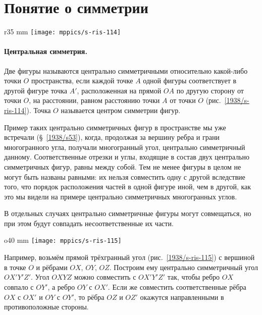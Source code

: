 \section{Понятие о симметрии}

\begin{wrapfigure}{r}{35 mm}
\vskip-0mm
\centering
\texttt{[image: mppics/s-ris-114]}
\caption{}\label{1938/s-ris-114}
\vskip-0mm
\end{wrapfigure}

\paragraph{Центральная симметрия.}\label{1938/s99}
Две фигуры называются центрально симметричными относительно какой-либо точки $O$ пространства, если каждой точке $A$ одной фигуры соответствует в другой фигуре точка $A'$, расположенная на прямой $OA$ по другую сторону от точки $O$, на расстоянии, равном расстоянию точки $A$ от точки $O$ (рис.~\ref{1938/s-ris-114}).
Точка $O$ называется центром симметрии фигур.

Пример таких центрально симметричных фигур в пространстве мы уже встречали (§~\ref{1938/s53}), когда, продолжая за вершину ребра и грани многогранного угла, получали многогранный угол, центрально симметричный данному.
Соответственные отрезки и углы, входящие в состав двух центрально симметричных фигур, равны между собой.
Тем не менее фигуры в целом не могут быть названы равными: их нельзя совместить одну с другой вследствие того, что порядок расположения частей в одной фигуре иной, чем в другой, как это мы видели на примере центрально симметричных многогранных углов.

В отдельных случаях центрально симметричные фигуры могут совмещаться, но при этом будут совпадать несоответственные их части.

\begin{wrapfigure}{o}{40 mm}
\vskip-0mm
\centering
\texttt{[image: mppics/s-ris-115]}
\caption{}\label{1938/s-ris-115}
\vskip-0mm
\end{wrapfigure}

Например, возьмём прямой трёхгранный угол (рис.~\ref{1938/s-ris-115}) с вершиной в точке $O$ и рёбрами $OX$, $OY$, $OZ$.
Построим ему центрально симметричный угол $OX'Y'Z'$.
Угол $OXYZ$ можно совместить с $OX'Y'Z'$ так, чтобы ребро $OX$ совпало с $OY'$, а ребро $OY$ с $OX'$.
Если же совместить соответственные рёбра $OX$ с $OX'$ и $OY$ с $OY'$, то рёбра $OZ$ и $OZ'$ окажутся направленными в противоположные стороны.

